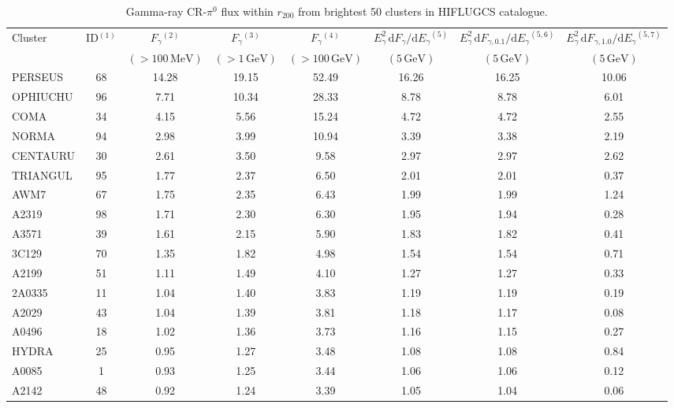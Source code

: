 \documentclass[10pt,aps,pra,reprint,amsmath,amsfonts,amssymb,showpacs,nofootinbib,floatfix]{revtex4-1}
\newcommand{\rmn}{\mathrm}
\newcommand{\dd}{\rmn{d}}
\newcommand{\rvir}{r_{200}}
\newcommand{\eg}{E_\gamma}
\begin{document}
\begin{table}
\begin{minipage}{2.0\columnwidth}
  \caption{Gamma-ray CR-$\pi^0$ flux within $\rvir$ from brightest 50 clusters in HIFLUGCS catalogue.}
\begin{tabular}{l  c c c c c c c}
\hline
\hline
 Cluster & ID$^{(1)}$ & $F_{\gamma}$$^{(2)}$ & $F_{\gamma}$$^{(3)}$& 
 $F_{\gamma}$$^{(4)}$ & $\eg^2\,\dd F_{\gamma}/\dd \eg$$^{(5)}$ &
 $\eg^2\,\dd F_{\gamma,0.1}/\dd \eg$$^{(5,6)}$ & 
 $\eg^2\,\dd F_{\gamma,1.0}/\dd \eg$$^{(5,7)}$\\
  & & $(>100\,\rmn{MeV})$ & $(>1\,\rmn{GeV})$ & $(>100\,\rmn{GeV})$ & 
 $(5\,\rmn{GeV})$ & $(5\,\rmn{GeV})$ &  $(5\,\rmn{GeV})$\\
 \hline
PERSEUS  &  68 &  14.28 &  19.15 &  52.49 &  16.26 &  16.25 &  10.06 \\
OPHIUCHU &  96 &   7.71 &  10.34 &  28.33 &   8.78 &   8.78 &   6.01 \\
COMA     &  34 &   4.15 &   5.56 &  15.24 &   4.72 &   4.72 &   2.55 \\
NORMA    &  94 &   2.98 &   3.99 &  10.94 &   3.39 &   3.38 &   2.19 \\
CENTAURU &  30 &   2.61 &   3.50 &   9.58 &   2.97 &   2.97 &   2.62 \\
TRIANGUL &  95 &   1.77 &   2.37 &   6.50 &   2.01 &   2.01 &   0.37 \\
AWM7     &  67 &   1.75 &   2.35 &   6.43 &   1.99 &   1.99 &   1.24 \\
A2319    &  98 &   1.71 &   2.30 &   6.30 &   1.95 &   1.94 &   0.28 \\
A3571    &  39 &   1.61 &   2.15 &   5.90 &   1.83 &   1.82 &   0.41 \\
3C129    &  70 &   1.35 &   1.82 &   4.98 &   1.54 &   1.54 &   0.71 \\
A2199    &  51 &   1.11 &   1.49 &   4.10 &   1.27 &   1.27 &   0.33 \\
2A0335   &  11 &   1.04 &   1.40 &   3.83 &   1.19 &   1.19 &   0.19 \\
A2029    &  43 &   1.04 &   1.39 &   3.81 &   1.18 &   1.17 &   0.08 \\
A0496    &  18 &   1.02 &   1.36 &   3.73 &   1.16 &   1.15 &   0.27 \\
HYDRA    &  25 &   0.95 &   1.27 &   3.48 &   1.08 &   1.08 &   0.84 \\
A0085    &   1 &   0.93 &   1.25 &   3.44 &   1.06 &   1.06 &   0.12 \\
A2142    &  48 &   0.92 &   1.24 &   3.39 &   1.05 &   1.04 &   0.06 \\

\end{tabular}
\end{minipage}
\end{table}
\end{document}
